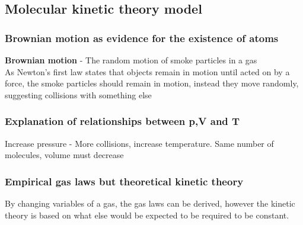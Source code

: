 \documentclass[12pt]{article}
\begin{document}
\subsection{Molecular kinetic theory model}
\subsubsection{Brownian motion as evidence for the existence of atoms}
\textbf{Brownian motion} - The random motion of smoke particles in a gas\\
As Newton's first law states that objects remain in motion until acted on by a force, the smoke particles should remain in motion, instead they move randomly, suggesting collisions with something else
\subsubsection{Explanation of relationships between p,V and T}
Increase pressure - More collisions, increase temperature. Same number of molecules, volume must decrease
\subsubsection{Empirical gas laws but theoretical kinetic theory}
By changing variables of a gas, the gas laws can be derived, however the kinetic theory is based on what else would be expected to be required to be constant.
\end{document}
